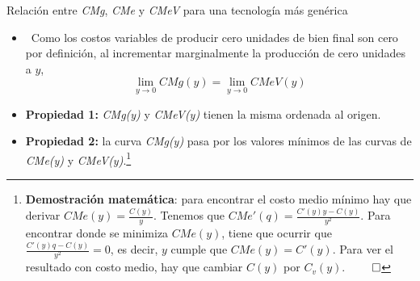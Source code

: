 \documentclass{beamer}
\theoremstyle{definition}
\begin{document}
\begin{frame}{\small Relación entre \textit{CMg}, \textit{CMe} y \textit{CMeV} para una tecnología más genérica}\small
\begin{itemize}
\item \ Como los costos variables de producir cero unidades de bien final son
cero por definici\'{o}n, al incrementar marginalmente la producci\'{o}n de cero unidades a $y$,
\begin{equation*}
\lim_{y \rightarrow 0}CMg\left( y \right)
=\lim_{y
\rightarrow 0}CMeV\left( y \right)
\end{equation*}

\item \textbf{Propiedad 1:} \textit{CMg(y)} y \textit{CMeV(y)} tienen la misma ordenada al origen. %

    \item \textbf{Propiedad 2: }la curva \textit{CMg(y)} pasa por los valores mínimos de las curvas de \textit{CMe(y)} y \textit{CMeV(y)}.\footnote{\textbf{Demostración matemática}: para encontrar el costo medio mínimo hay que derivar $CMe(y)=\frac{C(y)}{y}$. Tenemos que $CMe'(q)=\frac{C'(y)y-C(y)}{y^2}$. Para encontrar donde se minimiza $CMe(y)$, tiene que ocurrir que $\frac{C'(y)q-C(y)}{y^2}=0$, es decir, $y$ cumple que $CMe(y)=C'(y)$. Para ver el resultado con costo medio, hay que cambiar $C(y)$ por $C_v(y)$. $\qed$}
    
    \vspace{8pt}

\end{itemize}
\end{frame}
\end{document}

